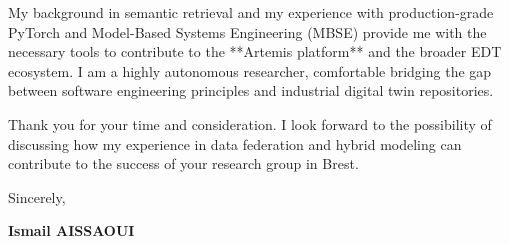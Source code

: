 \documentclass[a4paper,12pt]{article}
\begin{document}
My background in semantic retrieval and my experience with production-grade PyTorch and Model-Based Systems Engineering (MBSE) provide me with the necessary tools to contribute to the **Artemis platform** and the broader EDT ecosystem. I am a highly autonomous researcher, comfortable bridging the gap between software engineering principles and industrial digital twin repositories.

Thank you for your time and consideration. I look forward to the possibility of discussing how my experience in data federation and hybrid modeling can contribute to the success of your research group in Brest.

Sincerely,

\bigskip

\textbf{Ismail AISSAOUI}
\end{document}

